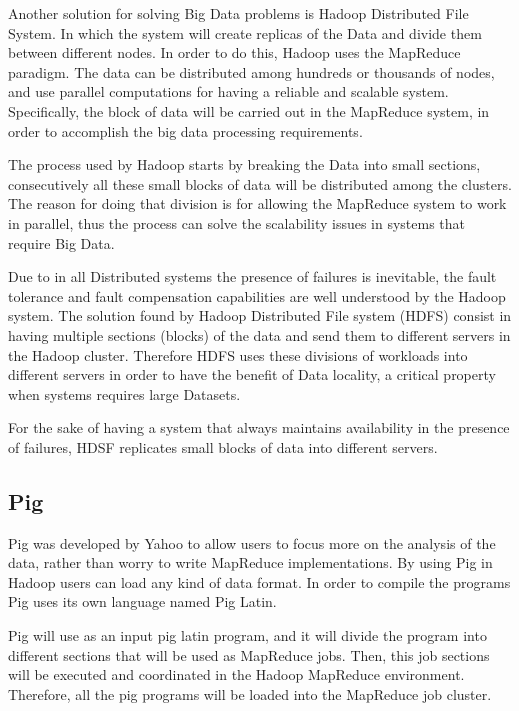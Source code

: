 Another solution for solving Big Data problems is Hadoop Distributed File System\cite{shvachko2010hadoop}. In which the system will create replicas of the Data and divide them between different nodes. In order to do this, Hadoop uses the MapReduce paradigm. The data can be distributed among hundreds or thousands of nodes, and use parallel computations for having a reliable and scalable system. Specifically, the block of data will be carried out in the MapReduce system, in order to accomplish the big data processing requirements.

The process used by Hadoop starts by breaking the Data into small sections, consecutively all these small blocks of data will be distributed among the clusters. The reason for doing that division is for allowing the MapReduce system to work in parallel, thus the process can solve the scalability issues in systems that require Big Data.

Due to in all Distributed systems the presence of failures is inevitable, the fault tolerance and fault compensation capabilities are well understood by the Hadoop system. The solution found by Hadoop Distributed File system (HDFS) consist in having multiple sections (blocks) of the data and send them to different servers in the Hadoop cluster. Therefore HDFS uses these divisions of workloads into different servers in order to have the benefit of Data locality, a critical property when systems requires large Datasets.

For the sake of having a system that always maintains availability in the presence of failures, HDSF replicates small blocks of data into different servers. 

\subsection{Pig}

Pig \cite{gates2009building} was developed by Yahoo to allow users to focus more on the analysis of the data, rather than worry to write MapReduce implementations. By using Pig in Hadoop users can load any kind of data format. In order to compile the programs Pig uses its own language named Pig Latin.

Pig will use as an input pig latin program, and it will divide the program into different sections that will be used as MapReduce jobs. Then, this job sections will be executed and coordinated in the Hadoop MapReduce environment. Therefore, all the pig programs will be loaded into the MapReduce job cluster.

